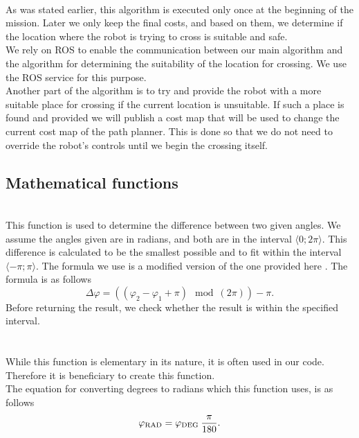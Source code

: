         \\
            As was stated earlier, this algorithm is executed only once at the beginning of the mission. Later we only keep the final costs, and based on them, we determine if the location where the robot is trying to cross is suitable and safe.\\
            We rely on ROS to enable the communication between our main algorithm and the algorithm for determining the suitability of the location for crossing. We use the ROS service for this purpose.\\
            Another part of the algorithm is to try and provide the robot with a more suitable place for crossing if the current location is unsuitable. If such a place is found and provided we will publish a cost map that will be used to change the current cost map of the path planner. This is done so that we do not need to override the robot's controls until we begin the crossing itself.

    \subsection{Mathematical functions}
    \label{sec:math_func}
        \\
            This function is used to determine the difference between two given angles. We assume the angles given are in radians, and both are in the interval $\langle0;2\pi\rangle$. This difference is calculated to be the smallest possible and to fit within the interval $\langle-\pi;\pi\rangle$. The formula we use is a modified version of the one provided here \cite{calc_rotation}. The formula is as follows
            \begin{equation}
                \Delta\varphi = \left((\varphi_{2} - \varphi_{1} + \pi) \mod (2\pi)\right) - \pi.
            \end{equation}
            Before returning the result, we check whether the result is within the specified interval.\\\\
        \\
            While this function is elementary in its nature, it is often used in our code. Therefore it is beneficiary to create this function.\\
            The equation for converting degrees to radians which this function uses, is as follows
            \begin{equation}
                \varphi_{\rm{RAD}} = \varphi_{\rm{DEG}}\:\frac{\pi}{180}.
            \end{equation}

